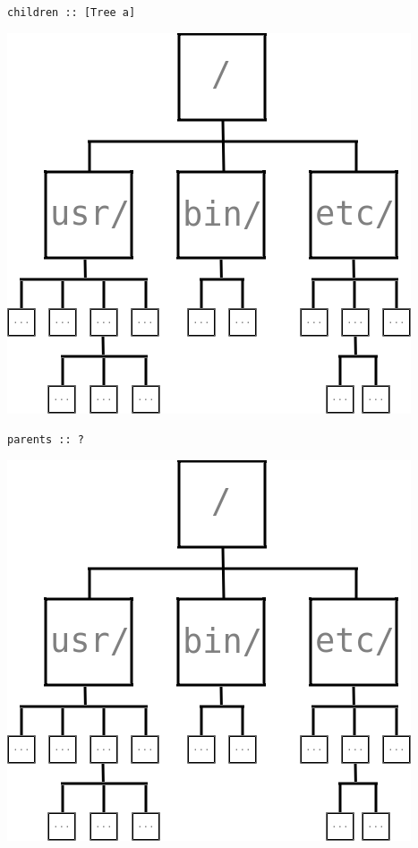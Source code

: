 \begin{frame}[fragile]
\begin{block}{\lstinline{children :: [Tree a]}}
\begin{center}
\includegraphics[width=0.60\textheight]{image/rosetree.png}
\end{center}
\end{block}
\end{frame}

\begin{frame}[fragile]
\begin{block}{\lstinline{parents :: ?}}
\begin{center}
\includegraphics[width=0.60\textheight]{image/rosetree.png}
\end{center}
\end{block}
\end{frame}

